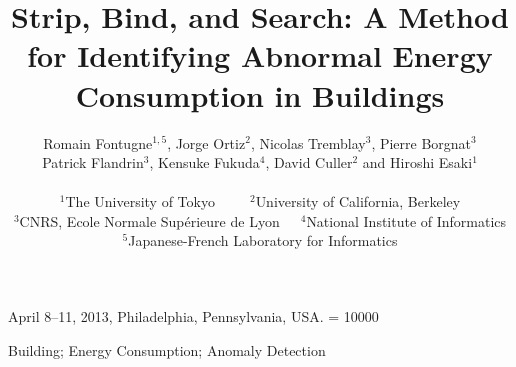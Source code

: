 \documentclass{sig-alternate}
\title{Strip, Bind, and Search: A Method for Identifying Abnormal Energy Consumption in Buildings}
\author{
Romain Fontugne{\large$^{1,5}$}, Jorge Ortiz{\large$^2$}, Nicolas Tremblay{\large$^3$}, Pierre Borgnat{\large$^3$}
\\
Patrick Flandrin{\large$^3$}, Kensuke Fukuda{\large$^4$}, David Culler{\large$^2$} and Hiroshi Esaki{\large$^1$}
\\~\\
{\large$^1$}The University of Tokyo~~~~~{\large$^2$}University of California, Berkeley\\
{\large$^3$}CNRS, Ecole Normale Sup\'erieure de Lyon~~~{\large$^4$}National Institute of Informatics\\
{\large$^5$}Japanese-French Laboratory for Informatics
}
\begin{document}
 {April 8--11, 2013, Philadelphia, Pennsylvania, USA.} 
\widowpenalty = 10000


\maketitle






\begin{keywords}
Building; Energy Consumption; Anomaly Detection
\end{keywords}



















\end{document}
